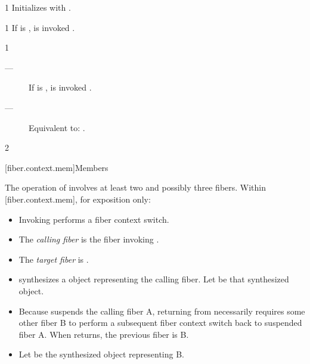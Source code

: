 
1 \effects
Initializes  with .


1 \effects
If  is \false,  is invoked .


1 \effects
\begin{description}
    \item[---] If  is \false,  is invoked .
    \item[---] Equivalent to: .
\end{description}

2 \returns
\this

[fiber.context.mem]{Members}

The operation of \resumewith involves at least two and possibly three fibers.
Within [fiber.context.mem], for exposition only:

\begin{itemize}
    \item Invoking \resumewith performs a fiber context switch.
    \item The \emph{calling fiber} is the fiber invoking \resumewith.
    \item The \emph{target fiber} is \thefiber{\state}.
    \item \resumewith synthesizes a \fiber object representing the calling
          fiber. Let  be that synthesized \fiber object.
    \item Because \resumewith suspends the calling fiber A, returning
          from \resumewith necessarily requires some other fiber B to perform a
          subsequent fiber context switch back to suspended fiber A.
          When \resumewith returns, the previous fiber is B.
    \item Let  be the synthesized \fiber object representing B.
\end{itemize}

